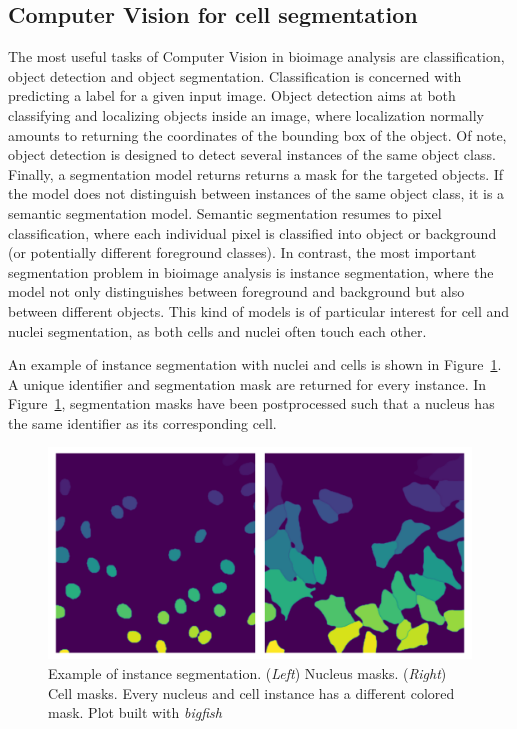 \subsection{Computer Vision for cell segmentation}
\label{subsec:segmentation_instance_introduction}

The most useful tasks of Computer Vision in bioimage analysis are classification, object detection and object segmentation.
Classification is concerned with predicting a label for a given input image.
Object detection aims at both classifying and localizing objects inside an image, where localization normally amounts to returning the coordinates of the bounding box of the object.
Of note, object detection is designed to detect several instances of the same object class.
Finally, a segmentation model returns returns a mask for the targeted objects.
If the model does not distinguish between instances of the same object class, it is a semantic segmentation model.
Semantic segmentation resumes to pixel classification, where each individual pixel is classified into object or background (or potentially different foreground classes).
In contrast, the most important segmentation problem in bioimage analysis is instance segmentation, where the model not only distinguishes between foreground and background but also between different objects.
This kind of models is of particular interest for cell and nuclei segmentation, as both cells and nuclei often touch each other.

An example of instance segmentation with nuclei and cells is shown in Figure~\ref{fig:instance_segmentation_example}.
A unique identifier and segmentation mask are returned for every instance.
In Figure~\ref{fig:instance_segmentation_example}, segmentation masks have been postprocessed such that a nucleus has the same identifier as its corresponding cell.

\begin{figure}[]
    \centering
    \includegraphics[width=\textwidth]{figures/chapter3/instance_segmentation}
    \caption[Example of instance segmentation]{Example of instance segmentation.
	(\textit{Left}) Nucleus masks.
	(\textit{Right}) Cell masks.
	Every nucleus and cell instance has a different colored mask.
	Plot built with \emph{bigfish}}
    \label{fig:instance_segmentation_example}
\end{figure}


